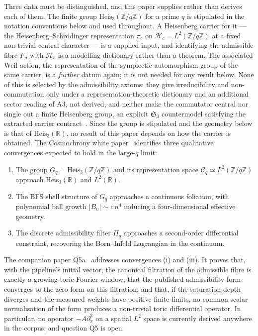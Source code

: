 \documentclass[11pt,a4paper]{article}
\theoremstyle{definition}
\theoremstyle{remark}
\newcommand{\HeisR}{\mathrm{Heis}_3(\mathbb{R})}
\newcommand{\HeisZ}{\mathrm{Heis}_3(\mathbb{Z}/q\mathbb{Z})}
\newcommand{\Gq}{G_q}
\newcommand{\Bn}{B_n}
\newcommand{\Cq}{\mathcal{C}_q}
\begin{document}
    Three data must be distinguished, and this paper supplies rather than derives each of them.
    The finite group $\HeisZ$ for a prime $q$ is stipulated in the notation conventions below and
    used throughout.
    A Heisenberg carrier for it --- the Heisenberg--Schr\"odinger representation $\pi_c$ on
    $\mathcal{H}_c = L^2(\mathbb{Z}/q\mathbb{Z})$ at a fixed non-trivial central character --- is a
    supplied input, and identifying the admissible fibre $F_n$ with $\mathcal{H}_c$ is a modelling
    dictionary rather than a theorem.
    The associated Weil action, the representation of the symplectic automorphism group of the same
    carrier, is a \emph{further} datum again; it is not needed for any result below.
    None of this is selected by the admissibility axioms: they give irreducibility and
    non-commutation only under a representation-theoretic dictionary and an additional sector reading of A3,
    not derived, and neither make the commutator central nor single out a finite Heisenberg
    group, an explicit $\mathfrak{S}_3$ countermodel satisfying the extracted carrier
    contract~\cite{Beau2026m,Beau2026HeisenbergStructure}.
    Since the group is stipulated and the geometry below is that of $\HeisR$, no result of this paper
    depends on how the carrier is obtained.
    The Cosmochrony white paper~\cite{Cosmochrony} identifies three qualitative convergences
    expected to hold in the large-$q$ limit:
    \begin{enumerate}
      \item[(i)] The group $\Gq = \HeisZ$ and its representation space $\Cq \simeq L^2(\mathbb{Z}/q\mathbb{Z})$
      approach $\HeisR$ and $L^2(\mathbb{R})$.
      \item[(ii)] The BFS shell structure of $\Gq$ approaches a continuous foliation, with
      polynomial ball growth $|\Bn| \sim c\,n^4$ inducing a four-dimensional effective geometry.
      \item[(iii)] The discrete admissibility filter $\Pi_q$ approaches a second-order differential
      constraint, recovering the Born--Infeld Lagrangian in the continuum.
    \end{enumerate}
    The companion paper Q5a~\cite{Beau2026q5a} addresses convergences (i) and (iii).
    It proves that, with the pipeline's initial vector, the canonical filtration of the
    admissible fibre is exactly a growing toric Fourier window; that the published
    admissibility form converges to the zero form on this filtration; and that, if the
    saturation depth diverges and the measured weights have positive finite limits, no common
    scalar normalisation of the form produces a non-trivial toric differential operator.
    In particular, no operator $-A\partial_x^2$ on a spatial $L^2$ space is currently derived
    anywhere in the corpus, and question Q5 is open.
\end{document}
